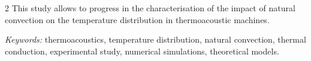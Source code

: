 {\begin{multicols}{2}
This study allows to progress in the characterisation of the impact of natural convection on the temperature distribution in thermoacoustic machines.
\end{multicols}
\bigskip

{\large \textit{Keywords:}} thermoacoustics, temperature distribution, natural convection, thermal conduction, experimental study, numerical simulations, theoretical models.

\vfill
}